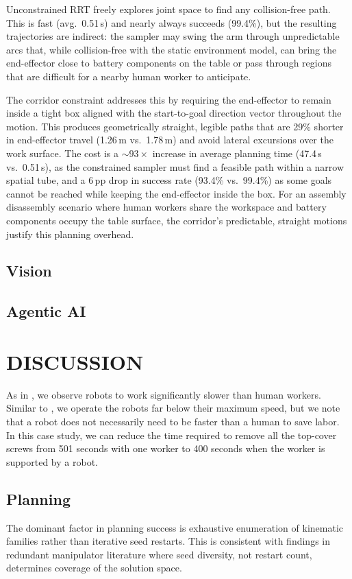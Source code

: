 \documentclass[letterpaper, 10 pt, conference]{ieeeconf}  %
\begin{document}


Unconstrained RRT freely explores joint space to find any collision-free path.
This is fast (avg.\ 0.51\,s) and nearly always succeeds (99.4\%), but the
resulting trajectories are indirect: the sampler may swing the arm through
unpredictable arcs that, while collision-free with the static environment model,
can bring the end-effector close to battery components on the table or pass
through regions that are difficult for a nearby human worker to anticipate.

The corridor constraint addresses this by requiring the end-effector to remain
inside a tight box aligned with the start-to-goal direction vector throughout
the motion.
This produces geometrically straight, legible paths that are 29\% shorter in
end-effector travel (1.26\,m vs.\ 1.78\,m) and avoid lateral excursions over
the work surface.
The cost is a ${\sim}93{\times}$ increase in average planning time (47.4\,s
vs.\ 0.51\,s), as the constrained sampler must find a feasible path within a
narrow spatial tube, and a 6\,pp drop in success rate (93.4\% vs.\ 99.4\%) as
some goals cannot be reached while keeping the end-effector inside the box.
For an assembly disassembly scenario where human workers share the workspace and
battery components occupy the table surface, the corridor's predictable,
straight motions justify this planning overhead.

\subsection{Vision}
\subsection{Agentic AI}



\section{DISCUSSION}
As in \cite{qu2024robotic}, we observe robots to work significantly slower than human workers. Similar to \cite{qu2024robotic}, we operate the robots far below their maximum speed, but we note that a robot does not necessarily need to be faster than a human to save labor. In this case study, we can reduce the time required to remove all the top-cover screws from 501 seconds with one worker to 400 seconds when the worker is supported by a robot. 

\subsection{Planning}
The dominant factor in planning success is exhaustive enumeration of kinematic
families rather than iterative seed restarts. This is consistent with findings
in redundant manipulator literature where seed diversity, not restart
count, determines coverage of the solution space.
\end{document}
